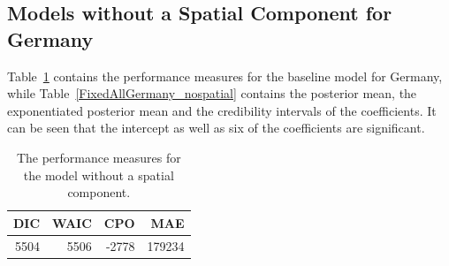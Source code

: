 \subsection{Models without a Spatial Component for Germany}\label{sec:nospatial_germany}
Table~\ref{allGermany_nospatial} contains the performance measures for the baseline model for Germany, while Table~\ref{FixedAllGermany_nospatial} contains the posterior mean, the exponentiated posterior mean and the credibility intervals of the coefficients. It can be seen that the intercept as well as six of the coefficients are significant.
\begin{table}[H] 
\caption{The performance measures for the model without a spatial component. \label{allGermany_nospatial}}
\begin{tabular}{r r r r}
\toprule
\textbf{DIC}	& \textbf{WAIC} & \textbf{CPO} & \textbf{MAE}\\
\midrule
5504 & 5506 & -2778 & 179234 \\
\bottomrule
\end{tabular}
\end{table}
